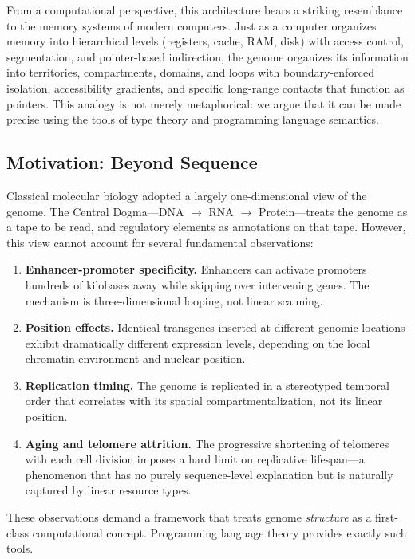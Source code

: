 \documentclass[12pt,a4paper]{article}
\theoremstyle{plain}
\theoremstyle{definition}
\begin{document}
From a computational perspective, this architecture bears a striking resemblance to the memory systems of modern computers. Just as a computer organizes memory into hierarchical levels (registers, cache, RAM, disk) with access control, segmentation, and pointer-based indirection, the genome organizes its information into territories, compartments, domains, and loops with boundary-enforced isolation, accessibility gradients, and specific long-range contacts that function as pointers. This analogy is not merely metaphorical: we argue that it can be made precise using the tools of type theory and programming language semantics.

\subsection{Motivation: Beyond Sequence}

Classical molecular biology adopted a largely one-dimensional view of the genome. The Central Dogma---DNA $\to$ RNA $\to$ Protein---treats the genome as a tape to be read, and regulatory elements as annotations on that tape. However, this view cannot account for several fundamental observations:

\begin{enumerate}[label=(\roman*)]
  \item \textbf{Enhancer-promoter specificity.} Enhancers can activate promoters hundreds of kilobases away while skipping over intervening genes. The mechanism is three-dimensional looping, not linear scanning.
  \item \textbf{Position effects.} Identical transgenes inserted at different genomic locations exhibit dramatically different expression levels, depending on the local chromatin environment and nuclear position.
  \item \textbf{Replication timing.} The genome is replicated in a stereotyped temporal order that correlates with its spatial compartmentalization, not its linear position.
  \item \textbf{Aging and telomere attrition.} The progressive shortening of telomeres with each cell division imposes a hard limit on replicative lifespan---a phenomenon that has no purely sequence-level explanation but is naturally captured by linear resource types.
\end{enumerate}

These observations demand a framework that treats genome \emph{structure} as a first-class computational concept. Programming language theory provides exactly such tools.
\end{document}
